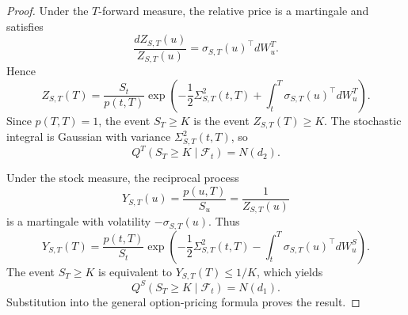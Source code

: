 \begin{proof}
Under the $T$-forward measure, the relative price is a martingale and satisfies
\[
\frac{dZ_{S,T}(u)}{Z_{S,T}(u)}
=\sigma_{S,T}(u)^\top dW_u^T.
\]
Hence
\[
Z_{S,T}(T)
=\frac{S_t}{p(t,T)}
 \exp\!\left(
 -\frac12\Sigma_{S,T}^2(t,T)
 +\int_t^T\sigma_{S,T}(u)^\top dW_u^T
 \right).
\]
Since $p(T,T)=1$, the event $S_T\geq K$ is the event
$Z_{S,T}(T)\geq K$. The stochastic integral is Gaussian with variance
$\Sigma_{S,T}^2(t,T)$, so
\[
Q^T(S_T\geq K\mid\mathcal{F}_t)=N(d_2).
\]

Under the stock measure, the reciprocal process
\[
Y_{S,T}(u)=\frac{p(u,T)}{S_u}=\frac1{Z_{S,T}(u)}
\]
is a martingale with volatility $-\sigma_{S,T}(u)$. Thus
\[
Y_{S,T}(T)
=\frac{p(t,T)}{S_t}
 \exp\!\left(
 -\frac12\Sigma_{S,T}^2(t,T)
 -\int_t^T\sigma_{S,T}(u)^\top dW_u^S
 \right).
\]
The event $S_T\geq K$ is equivalent to $Y_{S,T}(T)\leq1/K$, which yields
\[
Q^S(S_T\geq K\mid\mathcal{F}_t)=N(d_1).
\]
Substitution into the general option-pricing formula proves the result.
\end{proof}


